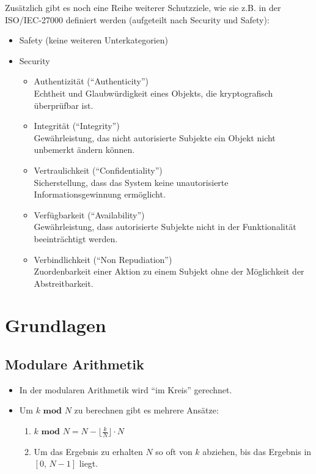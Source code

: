 	    Zusätzlich gibt es noch eine Reihe weiterer Schutzziele, wie sie z.B. in der ISO/IEC-27000 definiert werden (aufgeteilt nach Security und Safety):
	    \begin{itemize}
	    	\item Safety (keine weiteren Unterkategorien)
	    	\item Security
			    \begin{itemize}
			    	\item Authentizität (\enquote{Authenticity}) \\ Echtheit und Glaubwürdigkeit eines Objekts, die kryptografisch überprüfbar ist.
			    	\item Integrität (\enquote{Integrity}) \\ Gewährleistung, das nicht autorisierte Subjekte ein Objekt nicht unbemerkt ändern können.
			    	\item Vertraulichkeit (\enquote{Confidentiality}) \\ Sicherstellung, dass das System keine unautorisierte Informationsgewinnung ermöglicht.
			    	\item Verfügbarkeit (\enquote{Availability}) \\ Gewährleistung, dass autorisierte Subjekte nicht in der Funktionalität beeinträchtigt werden.
			    	\item Verbindlichkeit (\enquote{Non Repudiation}) \\ Zuordenbarkeit einer Aktion zu einem Subjekt ohne der Möglichkeit der Abstreitbarkeit.
			    \end{itemize}
	    \end{itemize}

\chapter{Grundlagen}
    \section{Modulare Arithmetik}
        \begin{itemize}
        	\item In der modularen Arithmetik wird \enquote{im Kreis} gerechnet.
        	\item Um \( k \textbf{ mod } N \) zu berechnen gibt es mehrere Ansätze:
            	\begin{enumerate}
            		\item \( k \textbf{ mod } N = N - \lfloor \frac{k}{N} \rfloor \cdot N \)
            		\item Um das Ergebnis zu erhalten \(N\) so oft von \(k\) abziehen, bis das Ergebnis in \( [0,\, N - 1] \) liegt.
            	\end{enumerate}
        \end{itemize}
        
